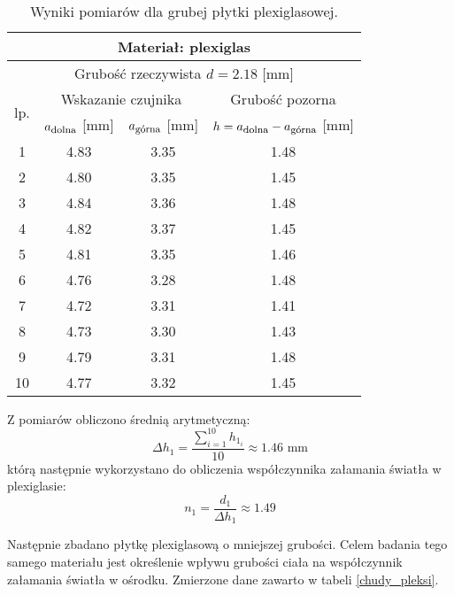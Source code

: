 \documentclass[a4paper,12pts]{article}
\begin{document}
	\begin{table}[!h]
		\centering
		\begin{tabular}{| c | c | c | c |}
			\hline
			\multicolumn{4}{|c|}{Materiał: plexiglas}  \\ \hline
			\multicolumn{4}{|c|}{Grubość rzeczywista $d = 2.18$ [mm] } \\ \hline
			\multirow{2}{*}{lp.} & \multicolumn{2}{|c|}{Wskazanie czujnika} & Grubość pozorna \\ \cline{2-4}
			& $a_{\textrm{\footnotesize dolna}}$ [mm] & $a_{\textrm{\footnotesize górna}}$ [mm] & $h = a_{\textrm{\footnotesize dolna}} - a_{\textrm{\footnotesize górna}}$ [mm] \\ \hline
			1  & 4.83 & 3.35 & 1.48 \\ \hline
			2  & 4.80 & 3.35 & 1.45 \\ \hline
			3  & 4.84 & 3.36 & 1.48 \\ \hline
			4  & 4.82 & 3.37 & 1.45 \\ \hline
			5  & 4.81 & 3.35 & 1.46 \\ \hline
			6  & 4.76 & 3.28 & 1.48 \\ \hline
			7  & 4.72 & 3.31 & 1.41 \\ \hline
			8  & 4.73 & 3.30 & 1.43 \\ \hline
			9  & 4.79 & 3.31 & 1.48 \\ \hline
			10 & 4.77 & 3.32 & 1.45 \\ \hline
		\end{tabular}
		\caption{Wyniki pomiarów dla grubej płytki plexiglasowej.}
		\label{gruby_pleksi}
	\end{table}
	
	Z pomiarów obliczono średnią arytmetyczną:
	\begin{equation}
		\Delta h_1 = \frac{\sum_{i = 1}^{10} h_{1_i}}{10} \approx 1.46 \textrm{ mm}
	\end{equation}
	którą następnie wykorzystano do obliczenia współczynnika załamania światła w plexiglasie:
	\begin{equation}
		n_1 = \frac{d_1}{\Delta h_1} \approx 1.49
	\end{equation}
	
	Następnie zbadano płytkę plexiglasową o mniejszej grubości. Celem badania tego samego materiału jest określenie wpływu grubości ciała na współczynnik załamania światła w ośrodku. Zmierzone dane zawarto w tabeli \ref{chudy_pleksi}.
	
\end{document}
